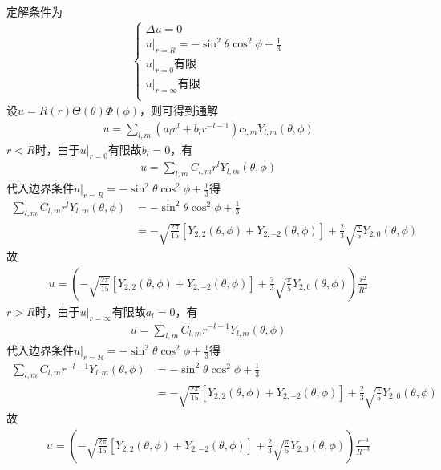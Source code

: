 \documentclass{phyasgn}
\begin{document}
\begin{sol}[3]
    定解条件为
    \begin{align*}
        \left\{
        \begin{matrix}
            \Delta u=0\\
            u|_{r=R}=-\sin^2\theta\cos^2\phi+\frac{1}{3}\\
            u|_{r=0}\text{有限}\\
            u|_{r=\infty}\text{有限}\\
        \end{matrix}
        \right.
    \end{align*}
    设$u=R(r)\Theta(\theta)\Phi(\phi)$，则可得到通解
    \begin{align*}
        u=\sum_{l,m}(a_lr^l+b_lr^{-l-1})c_{l,m}Y_{l,m}(\theta,\phi)
    \end{align*}
    $r<R$时，由于$ u|_{r=0}\text{有限}$故$b_l=0$，有
    \begin{align*}
        u=\sum_{l,m}C_{l,m}r^lY_{l,m}(\theta,\phi)
    \end{align*}
    代入边界条件$u|_{r=R}=-\sin^2\theta\cos^2\phi+\frac{1}{3}$得
    \begin{align*}
        \sum_{l,m}C_{l,m}r^lY_{l,m}(\theta,\phi)&=-\sin^2\theta\cos^2\phi+\frac{1}{3}\\
        &=-\sqrt{\frac{2\pi}{15}}\left[Y_{2,2}(\theta,\phi)+Y_{2,-2}(\theta,\phi)\right]+\frac{2}{3}\sqrt{\frac{\pi}{5}}Y_{2,0}(\theta,\phi)
    \end{align*}
    故
    \begin{align*}
        u=\left(-\sqrt{\frac{2\pi}{15}}\left[Y_{2,2}(\theta,\phi)+Y_{2,-2}(\theta,\phi)\right]+\frac{2}{3}\sqrt{\frac{\pi}{5}}Y_{2,0}(\theta,\phi)\right)\frac{r^2}{R^2}
    \end{align*}
    $r>R$时，由于$ u|_{r=\infty}\text{有限}$故$a_l=0$，有
    \begin{align*}
        u=\sum_{l,m}C_{l,m}r^{-l-1}Y_{l,m}(\theta,\phi)
    \end{align*}
    代入边界条件$u|_{r=R}=-\sin^2\theta\cos^2\phi+\frac{1}{3}$得
    \begin{align*}
        \sum_{l,m}C_{l,m}r^{-l-1}Y_{l,m}(\theta,\phi)&=-\sin^2\theta\cos^2\phi+\frac{1}{3}\\
        &=-\sqrt{\frac{2\pi}{15}}\left[Y_{2,2}(\theta,\phi)+Y_{2,-2}(\theta,\phi)\right]+\frac{2}{3}\sqrt{\frac{\pi}{5}}Y_{2,0}(\theta,\phi)
    \end{align*}
    故
    \begin{align*}
        u=\left(-\sqrt{\frac{2\pi}{15}}\left[Y_{2,2}(\theta,\phi)+Y_{2,-2}(\theta,\phi)\right]+\frac{2}{3}\sqrt{\frac{\pi}{5}}Y_{2,0}(\theta,\phi)\right)\frac{r^{-3}}{R^{-3}}
    \end{align*}
\end{sol}\par
\end{document}
